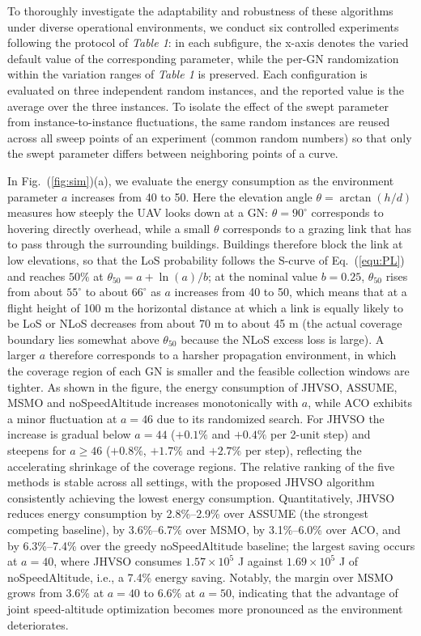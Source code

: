 To thoroughly investigate the adaptability and robustness of these algorithms under diverse operational environments, we conduct six controlled experiments following the protocol of \textit{Table 1}: in each subfigure, the x-axis denotes the varied default value of the corresponding parameter, while the per-GN randomization within the variation ranges of \textit{Table 1} is preserved.
Each configuration is evaluated on three independent random instances, and the reported value is the average over the three instances.
To isolate the effect of the swept parameter from instance-to-instance fluctuations, the same random instances are reused across all sweep points of an experiment (common random numbers) so that only the swept parameter differs between neighboring points of a curve.

In Fig.~(\ref{fig:sim})(a), we evaluate the energy consumption as the environment parameter $a$ increases from 40 to 50.
Here the elevation angle $\theta=\arctan(h/d)$ measures how steeply the UAV looks down at a GN: $\theta=90^{\circ}$ corresponds to hovering directly overhead, while a small $\theta$ corresponds to a grazing link that has to pass through the surrounding buildings.
Buildings therefore block the link at low elevations, so that the LoS probability follows the S-curve of Eq.~(\ref{equ:PL}) and reaches $50\%$ at $\theta_{50}=a+\ln(a)/b$; at the nominal value $b=0.25$, $\theta_{50}$ rises from about $55^{\circ}$ to about $66^{\circ}$ as $a$ increases from 40 to 50, which means that at a flight height of 100 m the horizontal distance at which a link is equally likely to be LoS or NLoS decreases from about 70 m to about 45 m (the actual coverage boundary lies somewhat above $\theta_{50}$ because the NLoS excess loss is large).
A larger $a$ therefore corresponds to a harsher propagation environment, in which the coverage region of each GN is smaller and the feasible collection windows are tighter.
As shown in the figure, the energy consumption of JHVSO, ASSUME, MSMO and noSpeedAltitude increases monotonically with $a$, while ACO exhibits a minor fluctuation at $a=46$ due to its randomized search.
For JHVSO the increase is gradual below $a=44$ ($+0.1\%$ and $+0.4\%$ per 2-unit step) and steepens for $a\ge46$ ($+0.8\%$, $+1.7\%$ and $+2.7\%$ per step), reflecting the accelerating shrinkage of the coverage regions.
The relative ranking of the five methods is stable across all settings, with the proposed JHVSO algorithm consistently achieving the lowest energy consumption.
Quantitatively, JHVSO reduces energy consumption by 2.8\%--2.9\% over ASSUME (the strongest competing baseline), by 3.6\%--6.7\% over MSMO, by 3.1\%--6.0\% over ACO, and by 6.3\%--7.4\% over the greedy noSpeedAltitude baseline; the largest saving occurs at $a=40$, where JHVSO consumes $1.57\times10^{5}$ J against $1.69\times10^{5}$ J of noSpeedAltitude, i.e., a 7.4\% energy saving.
Notably, the margin over MSMO grows from 3.6\% at $a=40$ to 6.6\% at $a=50$, indicating that the advantage of joint speed-altitude optimization becomes more pronounced as the environment deteriorates.

